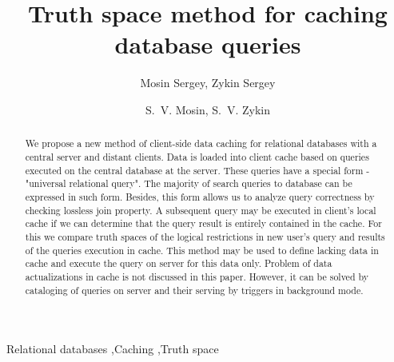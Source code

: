 \documentclass[preprint,12pt]{elsarticle}
\author{Mosin Sergey, Zykin Sergey}
\begin{document}
\begin{frontmatter}



\title{Truth space method for caching database queries}


\author{S.~V. Mosin, S.~V. Zykin}

\address{Sobolev Institute of Mathematics of the Siberian Branch
of the Russian Academy of Sciences}

\begin{abstract}
We propose a new method of client-side data caching for relational databases
with a central server and distant clients. Data is loaded into client cache
based on queries executed on the central database at the server. These
queries have a special form - "universal relational query". The majority of
search queries to database can be expressed in such form. Besides, this form
allows us to analyze query correctness by checking lossless join property. A
subsequent query may be executed in client's local cache if we can determine
that the query result is entirely contained in the cache. For this we compare
truth spaces of the logical restrictions in new user's query and results of
the queries execution in cache. This method may be used to define lacking data
in cache and execute the query on server for this data only. Problem of data
actualizations in cache is not discussed in this paper. However, it can be
solved by cataloging of queries on server and their serving by triggers in
background mode.
\end{abstract}

\begin{keyword}


Relational databases \sep Caching \sep Truth space
\end{keyword}

\end{frontmatter}
\end{document}
